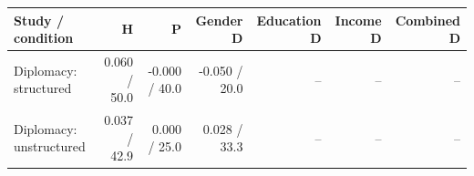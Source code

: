
\begin{tabular}{lrrrrrr}
\toprule
Study / condition & H & P & Gender D & Education D & Income D & Combined D\\
\midrule
Diplomacy: structured & 0.060 / 50.0 & -0.000 / 40.0 & -0.050 / 20.0 & -- & -- & --\\
Diplomacy: unstructured & 0.037 / 42.9 & 0.000 / 25.0 & 0.028 / 33.3 & -- & -- & --\\
\bottomrule
\end{tabular}
